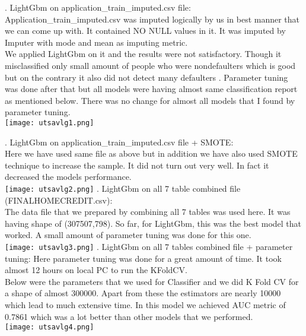 \documentclass[fleqn,10pt]{SelfArx} %
\begin{document}
\begin{itemize}
.	LightGbm on application_train_imputed.csv file:\\
Application_train_imputed.csv was imputed logically by us in best manner that we can come up with. It contained NO NULL values in it. It was imputed by Imputer with mode and mean as imputing metric. \\

\noindent
We applied LightGbm on it and the results were not satisfactory. Though it misclassified only small amount of people who were nondefaulters which is good but on the contrary it also did not detect many defaulters . Parameter tuning was done after that but all models were having almost same classification report as mentioned below. There was no change for almost all models that I found by parameter tuning. \\ 

\texttt{[image: utsavlg1.png]}
\label{fig:results}

\bigbreak
{}.	LightGbm on application_train_imputed.csv file + SMOTE:\\
Here we have used same file as above but in addition we have also used SMOTE technique to increase the sample. It did not turn out very well. In fact it decreased the models performance.\\ 

\texttt{[image: utsavlg2.png]}
\label{fig:results}
\bigbreak
{}.	LightGbm on all 7 table combined file (FINALHOMECREDIT.csv):\\
\bigbreak
\noindent
The data file that we prepared by combining all 7 tables was used here. It was having shape of (307507,798). So far, for LightGbm, this was the best model that worked. A small amount of parameter tuning was done for this one. \\

\texttt{[image: utsavlg3.png]}
\label{fig:results}
\bigbreak
{}.	LightGbm on all 7 tables combined file + parameter tuning:
Here parameter tuning was done for a great amount of time. It took almost 12 hours on local PC to run the KFoldCV.\\
Below were the parameters that we used for Classifier and we did K Fold CV for a shape of almost 300000. Apart from these the estimators are nearly 10000 which lead to much extensive time. In this model we achieved AUC metric of 0.7861 which was a lot better than other models that we performed. \\
\texttt{[image: utsavlg4.png]}
\label{fig:results}



\end{itemize}
\end{document}
